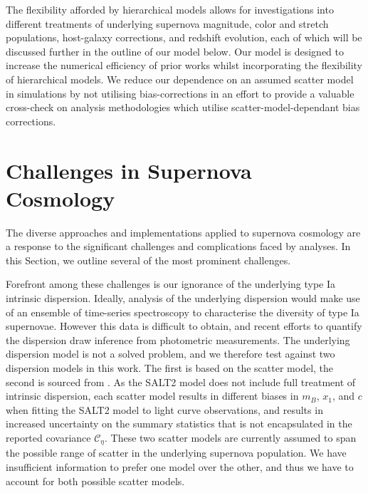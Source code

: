 \documentclass[a4paper,fleqn,usenatbib]{emulateapj}
\newcommand{\gten}{\citetalias{Guy2010}}
\newcommand{\celeven}{\citetalias{Chotard2011}}
\begin{document}
The flexibility afforded by hierarchical models allows for investigations into different treatments of underlying supernova magnitude, color and stretch populations, host-galaxy corrections, and redshift evolution, each of which will be discussed further in the outline of our model below. Our model is designed to increase the numerical efficiency of prior works whilst incorporating the flexibility of hierarchical models. We reduce our dependence on an assumed scatter model in simulations by not utilising bias-corrections in an effort to provide a valuable cross-check on analysis methodologies which utilise scatter-model-dependant bias corrections.





\section{Challenges in Supernova Cosmology}
\label{sec:challenges}


 The diverse approaches and implementations applied to supernova cosmology are a response to the significant challenges and complications faced by analyses. In this Section, we outline several of the most prominent challenges. 

 Forefront among these challenges is our ignorance of the underlying type Ia intrinsic dispersion. Ideally, analysis of the underlying dispersion would make use of an ensemble of time-series spectroscopy to characterise the diversity of type Ia supernovae. However this data is difficult to obtain, and recent efforts to quantify the dispersion draw inference from photometric measurements. The underlying dispersion model is not a solved problem, and we therefore test against two dispersion models in this work. The first is based on the \citet[][hereafter denoted {\gten}]{Guy2010} scatter model, the second is sourced from \citet[][hereafter denoted {\celeven}]{Chotard2011}. As the SALT2 model does not include full treatment of intrinsic dispersion, each scatter model results in different biases in $m_B$, $x_1$, and $c$ when fitting the SALT2 model to light curve observations, and results in increased uncertainty on the summary statistics that is not encapsulated in the reported covariance $\mathcal{C_\eta}$. These two scatter models are currently assumed to span the possible range of scatter in the underlying supernova population. We have insufficient information to prefer one model over the other, and thus we have to account for both possible scatter models.
\end{document}
